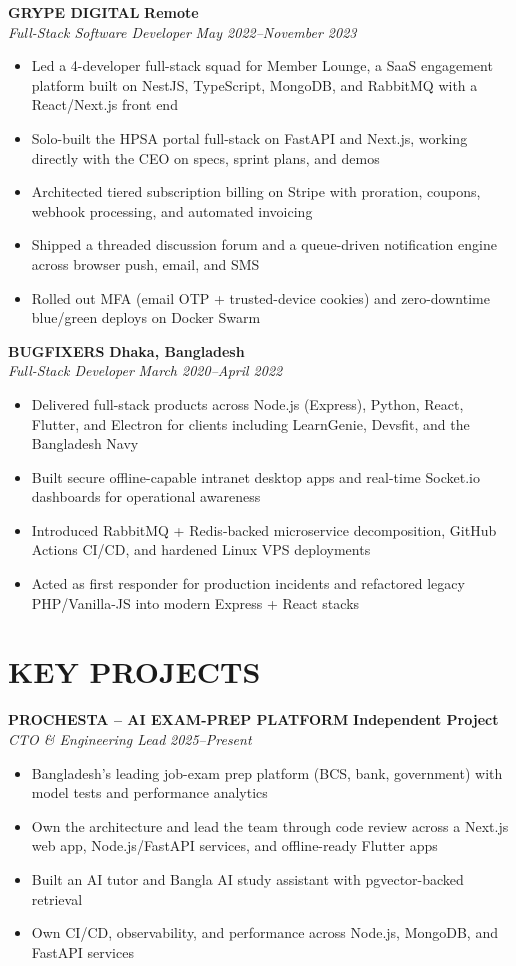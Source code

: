 \documentclass[11pt,letterpaper]{article}
\newcommand{\role}[4]{
  \begin{center}
  \textbf{#1} \hfill \textbf{#2} \\
  \textit{#3} \hfill \textit{#4}
  \end{center}
}
\begin{document}
\role{GRYPE DIGITAL}{Remote}{Full-Stack Software Developer}{May 2022--November 2023}
\begin{itemize}[leftmargin=*,nosep,topsep=0pt]
  \item Led a 4-developer full-stack squad for Member Lounge, a SaaS engagement platform built on NestJS, TypeScript, MongoDB, and RabbitMQ with a React/Next.js front end
  \item Solo-built the HPSA portal full-stack on FastAPI and Next.js, working directly with the CEO on specs, sprint plans, and demos
  \item Architected tiered subscription billing on Stripe with proration, coupons, webhook processing, and automated invoicing
  \item Shipped a threaded discussion forum and a queue-driven notification engine across browser push, email, and SMS
  \item Rolled out MFA (email OTP + trusted-device cookies) and zero-downtime blue/green deploys on Docker Swarm
\end{itemize}

\role{BUGFIXERS}{Dhaka, Bangladesh}{Full-Stack Developer}{March 2020--April 2022}
\begin{itemize}[leftmargin=*,nosep,topsep=0pt]
  \item Delivered full-stack products across Node.js (Express), Python, React, Flutter, and Electron for clients including LearnGenie, Devsfit, and the Bangladesh Navy
  \item Built secure offline-capable intranet desktop apps and real-time Socket.io dashboards for operational awareness
  \item Introduced RabbitMQ + Redis-backed microservice decomposition, GitHub Actions CI/CD, and hardened Linux VPS deployments
  \item Acted as first responder for production incidents and refactored legacy PHP/Vanilla-JS into modern Express + React stacks
\end{itemize}

\vspace{1em}
\section{KEY PROJECTS}

\vspace{0.5em}
\role{PROCHESTA -- AI EXAM-PREP PLATFORM}{Independent Project}{CTO \& Engineering Lead}{2025--Present}
\begin{itemize}[leftmargin=*,nosep,topsep=0pt]
  \item Bangladesh's leading job-exam prep platform (BCS, bank, government) with model tests and performance analytics
  \item Own the architecture and lead the team through code review across a Next.js web app, Node.js/FastAPI services, and offline-ready Flutter apps
  \item Built an AI tutor and Bangla AI study assistant with pgvector-backed retrieval
  \item Own CI/CD, observability, and performance across Node.js, MongoDB, and FastAPI services
\end{itemize}
\end{document}
